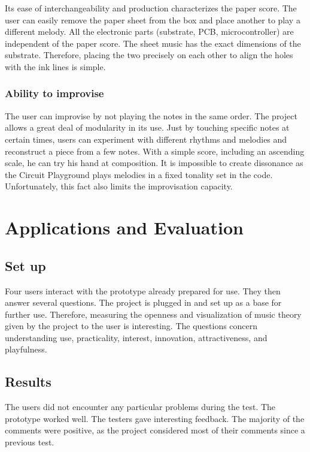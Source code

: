 Its ease of interchangeability and production characterizes the paper score. The user can easily remove the paper sheet from the box and place another to play a different melody. All the electronic parts (substrate, PCB, microcontroller) are independent of the paper score. The sheet music has the exact dimensions of the substrate.
Therefore, placing the two precisely on each other to align the holes with the ink lines is simple.

\subsubsection{Ability to improvise}

The user can improvise by not playing the notes in the same order.
The project allows a great deal of modularity in its use. Just by touching specific notes at certain times, users can experiment with different rhythms and melodies and reconstruct a piece from a few notes.
With a simple score, including an ascending scale, he can try his hand at composition.
It is impossible to create dissonance as the Circuit Playground plays melodies in a fixed tonality set in the code. Unfortunately, this fact also limits the improvisation capacity.


\section{Applications and Evaluation}

\subsection{Set up}

Four users interact with the prototype already prepared for use. They then answer several questions. The project is plugged in and set up as a base for further use. Therefore, measuring the openness and visualization of music theory given by the project to the user is interesting. The questions concern understanding use, practicality, interest, innovation, attractiveness, and playfulness.

\subsection{Results}

The users did not encounter any particular problems during the test. The prototype worked well. The testers gave interesting feedback. The majority of the comments were positive, as the project considered most of their comments since a previous test.


